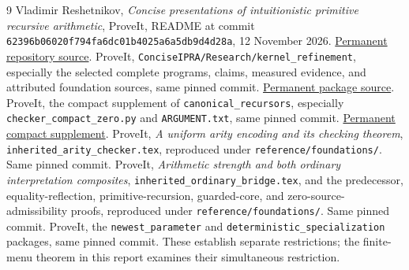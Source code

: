 \documentclass[11pt]{article}
\theoremstyle{definition}
\theoremstyle{remark}
\begin{document}
\begin{thebibliography}{9}
 Vladimir Reshetnikov, \emph{Concise presentations of
intuitionistic primitive recursive arithmetic}, ProveIt,
README at commit \texttt{62396b06020f794fa6dc01b4025a6a5db9d4d28a},
12 November 2026.
\href{https://github.com/VladimirReshetnikov/ProveIt/blob/62396b06020f794fa6dc01b4025a6a5db9d4d28a/Logic/PrimitiveRecursiveArithmetic/ConciseIPRA/README.md}{Permanent repository source}.
 ProveIt, \texttt{ConciseIPRA/Research/kernel\_refinement},
especially the selected complete programs, claims, measured evidence,
and attributed foundation sources, same pinned commit.
\href{https://github.com/VladimirReshetnikov/ProveIt/tree/62396b06020f794fa6dc01b4025a6a5db9d4d28a/Logic/PrimitiveRecursiveArithmetic/ConciseIPRA/Research/kernel_refinement}{Permanent package source}.
 ProveIt, the compact supplement of
\texttt{canonical\_recursors},
especially \texttt{checker\_compact\_zero.py} and \texttt{ARGUMENT.txt},
same pinned commit.
\href{https://github.com/VladimirReshetnikov/ProveIt/tree/62396b06020f794fa6dc01b4025a6a5db9d4d28a/Logic/PrimitiveRecursiveArithmetic/ConciseIPRA/Research/canonical_recursors/compact}{Permanent compact supplement}.
 ProveIt, \emph{A uniform arity encoding and its checking
theorem}, \texttt{inherited\_arity\_checker.tex}, reproduced under
\texttt{reference/foundations/}.  Same pinned commit.
 ProveIt, \emph{Arithmetic strength and both ordinary
interpretation composites}, \texttt{inherited\_ordinary\_bridge.tex},
and the predecessor, equality-reflection, primitive-recursion, guarded-core,
and zero-source-admissibility proofs, reproduced under
\texttt{reference/foundations/}.  Same pinned commit.
 ProveIt, the \texttt{newest\_parameter}
and \texttt{deterministic\_specialization} packages,
same pinned commit.  These establish separate restrictions; the finite-menu
theorem in this report examines their simultaneous restriction.
\end{thebibliography}
\end{document}
